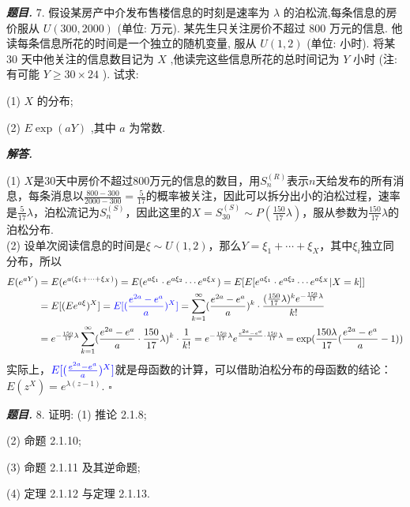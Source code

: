 \documentclass[10pt, a4paper, oneside]{ctexart}
\newenvironment{problem}{\begin{framed}\par\noindent\textbf{\textit{题目. }}}{\end{framed}\par}
\newenvironment{solution}{%
  \par\noindent\textbf{\textit{解答. }}\ignorespaces
}{%
  \hfill\ensuremath{\square}\par %
}
\begin{document}
\begin{problem}
    7. 假设某房产中介发布售楼信息的时刻是速率为 \( \lambda  \) 的泊松流,每条信息的房价服从 \( U\left( {{300},{2000}}\right)  \) (单位: 万元). 某先生只关注房价不超过 800 万元的信息. 他读每条信息所花的时间是一个独立的随机变量, 服从 \( U\left( {1,2}\right)  \) (单位: 小时). 将某 30 天中他关注的信息数目记为 \( X \) ,他读完这些信息所花的总时间记为 \( Y \) 小时 (注: 有可能 \( Y \geq  {30} \times  {24} \) ). 试求:

(1) \( X \) 的分布;

(2) \( E\exp \left( {aY}\right)  \) ,其中 \( a \) 为常数.
\end{problem}
\begin{solution}
    (1) $X$是$30$天中房价不超过$800$万元的信息的数目，用$S_n^{(R)}$表示$n$天给发布的所有消息，每条消息以$\frac{800-300}{2000-300}=\frac{5}{17}$的概率被关注，因此可以拆分出小的泊松过程，速率是$\frac{5}{17}\lambda$，泊松流记为$S_n^{(S)}$，因此这里的$X=S_{30}^{(S)}\sim P(\frac{150}{17}\lambda)$，服从参数为$\frac{150}{17}\lambda$的泊松分布.\\
    (2) 设单次阅读信息的时间是$\xi\sim U(1,2)$，那么$Y=\xi_1+\cdots+\xi_{X}$，其中$\xi_i$独立同分布，所以 
    \begin{align*}
        E(e^{aY})&=E(e^{a(\xi_1+\cdots+\xi_X)})=E(e^{a\xi_1}\cdot e^{a\xi_2}\cdots e^{a\xi_{X}})=E[E[e^{a\xi_1}\cdot e^{a\xi_2}\cdots e^{a\xi_{X}}|X=k]]\\
        &=E[(E e^{a\xi})^X]=\textcolor{blue}{E[(\frac{e^{2a}-e^a}{a})^X]}=\sum_{k=1}^{\infty} (\frac{e^{2a}-e^a}{a})^k \cdot \frac{(\frac{150}{17}\lambda)^k e^{-\frac{150}{17}\lambda }}{k!}\\
        &=e^{-\frac{150}{17}\lambda }\sum_{k=1}^{\infty} (\frac{e^{2a}-e^a}{a}\cdot \frac{150}{17}\lambda)^k \cdot \frac{ 1}{k!}=e^{-\frac{150}{17}\lambda }e^{\frac{e^{2a}-e^a}{a}\cdot \frac{150}{17}\lambda}=\exp(\frac{150\lambda}{17}(\frac{e^{2a}-e^a}{a}-1))
    \end{align*}
    实际上，$\textcolor{blue}{E[(\frac{e^{2a}-e^a}{a})^X]}$就是母函数的计算，可以借助泊松分布的母函数的结论：$E(z^{X})=e^{\lambda(z-1)}$.
\end{solution}

\begin{problem}
    8. 证明: (1) 推论 2.1.8;

(2) 命题 2.1.10;

(3) 命题 2.1.11 及其逆命题;

(4) 定理 2.1.12 与定理 2.1.13.
\end{problem}
\end{document}
